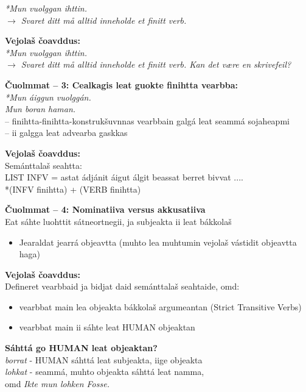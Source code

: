 \documentclass[landscape,norsk,11pt]{seminar}
\begin{document}
\begin{slide}
\textit{*Mun vuolggan ihttin.}\\
\textit{$\rightarrow$ Svaret ditt må alltid inneholde et finitt verb.} 

\newslide
\textbf{Vejolaš čoavddus:}\\

\textit{*Mun vuolggan ihttin.}\\
\textit{$\rightarrow$ Svaret ditt må alltid inneholde et finitt verb. Kan det være en skrivefeil?}


\newslide
\textbf{Čuolmmat -- 3: Cealkagis leat guokte finihtta vearbba:} \\

\textit{*Mun áiggun vuolggán.}\\
\textit{Mun boran haman.}\\
-- finihtta-finihtta-konstrukšuvnnas vearbbain galgá leat seammá sojaheapmi\\
-- ii galgga leat advearba gaskkas

\newslide
\textbf{Vejolaš čoavddus:} \\
Semánttalaš seahtta:\\
LIST INFV =  astat ádjánit áigut álgit beassat berret bivvat .... \\
\textnormal{*(INFV finihtta) + (VERB finihtta)}


\newslide
\textbf{Čuolmmat -- 4: Nominatiiva versus akkusatiiva} \\
Eat sáhte luohttit sátneortnegii, ja subjeakta ii leat bákkolaš
\begin{itemize}
\item Jearaldat jearrá objeavtta (muhto lea muhtumin vejolaš vástidit objeavtta haga)
\end{itemize}
\newslide
\textbf{Vejolaš čoavddus:} \\
Defineret vearbbaid ja bidjat daid semánttalaš seahtaide, omd: 
\begin{itemize}
\item vearbbat main lea objeakta bákkolaš argumeantan  (Strict Transitive Verbs)
\item vearbbat main ii sáhte leat HUMAN objeaktan 
\end{itemize}

\newslide
\textbf{Sáhttá go HUMAN leat objeaktan?} \\

 \textit{borrat}   - HUMAN sáhttá leat subjeakta, iige objeakta \\
 
  \textit{lohkat}  - seammá, muhto objeakta sáhttá leat namma, \\ omd   \textit{Ikte mun lohken Fosse.}


\end{slide}
\end{document}
